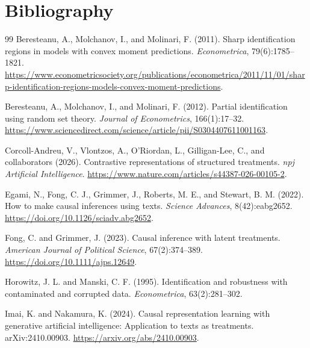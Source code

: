 \documentclass[11pt]{article}
\theoremstyle{definition}
\theoremstyle{plain}
\theoremstyle{remark}
\begin{document}
\section*{Bibliography}
\begin{thebibliography}{99}
Beresteanu, A., Molchanov, I., and Molinari, F. (2011).
\newblock Sharp identification regions in models with convex moment predictions.
\newblock \emph{Econometrica}, 79(6):1785--1821.
\newblock \url{https://www.econometricsociety.org/publications/econometrica/2011/11/01/sharp-identification-regions-models-convex-moment-predictions}.

Beresteanu, A., Molchanov, I., and Molinari, F. (2012).
\newblock Partial identification using random set theory.
\newblock \emph{Journal of Econometrics}, 166(1):17--32.
\newblock \url{https://www.sciencedirect.com/science/article/pii/S0304407611001163}.

Corcoll-Andreu, V., Vlontzos, A., O'Riordan, L., Gilligan-Lee, C., and collaborators (2026).
\newblock Contrastive representations of structured treatments.
\newblock \emph{npj Artificial Intelligence}.
\newblock \url{https://www.nature.com/articles/s44387-026-00105-2}.

Egami, N., Fong, C. J., Grimmer, J., Roberts, M. E., and Stewart, B. M. (2022).
\newblock How to make causal inferences using texts.
\newblock \emph{Science Advances}, 8(42):eabg2652.
\newblock \url{https://doi.org/10.1126/sciadv.abg2652}.

Fong, C. and Grimmer, J. (2023).
\newblock Causal inference with latent treatments.
\newblock \emph{American Journal of Political Science}, 67(2):374--389.
\newblock \url{https://doi.org/10.1111/ajps.12649}.

Horowitz, J. L. and Manski, C. F. (1995).
\newblock Identification and robustness with contaminated and corrupted data.
\newblock \emph{Econometrica}, 63(2):281--302.

Imai, K. and Nakamura, K. (2024).
\newblock Causal representation learning with generative artificial intelligence: Application to texts as treatments.
\newblock arXiv:2410.00903.
\newblock \url{https://arxiv.org/abs/2410.00903}.


\end{thebibliography}
\end{document}

